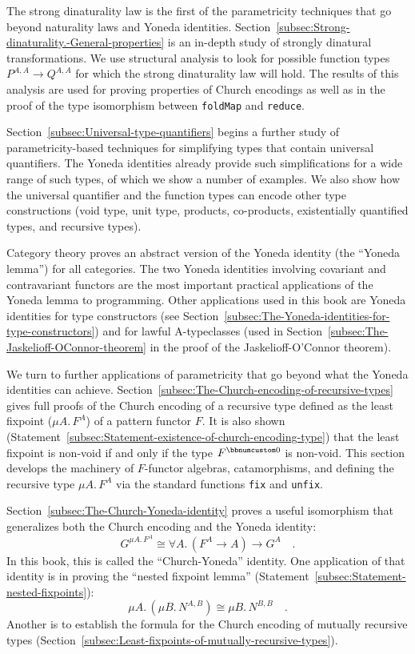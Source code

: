 The strong dinaturality law is the first of the parametricity techniques
that go beyond naturality laws and Yoneda identities. Section~\ref{subsec:Strong-dinaturality.-General-properties}
is an in-depth study of strongly dinatural transformations. We use
structural analysis to look for possible function types $P^{A,A}\rightarrow Q^{A,A}$
for which the strong dinaturality law will hold. The results of this
analysis are used for proving properties of Church encodings as well
as in the proof of the type isomorphism between \lstinline!foldMap!
and \lstinline!reduce!.

Section~\ref{subsec:Universal-type-quantifiers} begins a further
study of parametricity-based techniques for simplifying types that
contain universal quantifiers. The Yoneda identities already provide
such simplifications for a wide range of such types, of which we show
a number of examples. We also show how the universal quantifier and
the function types can encode other type constructions (void type,
unit type, products, co-products, existentially quantified types,
and recursive types).

Category theory proves an abstract version of the Yoneda identity
(the \textsf{``}Yoneda lemma\textsf{''}) for all categories. The two Yoneda identities
involving covariant and contravariant functors are the most important
practical applications of the Yoneda lemma to programming. Other applications
used in this book are Yoneda identities for type constructors (see
Section~\ref{subsec:The-Yoneda-identities-for-type-constructors})
and for lawful A-typeclasses (used in Section~\ref{subsec:The-Jaskelioff-OConnor-theorem}
in the proof of the Jaskelioff-O\textsf{'}Connor theorem).

We turn to further applications of parametricity that go beyond what
the Yoneda identities can achieve. Section~\ref{subsec:The-Church-encoding-of-recursive-types}
gives full proofs of the Church encoding of a recursive type defined
as the least fixpoint ($\mu A.\,F^{A}$) of a pattern functor $F$.
It is also shown (Statement~\ref{subsec:Statement-existence-of-church-encoding-type})
that the least fixpoint is non-void if and only if the type $F^{\bbnum 0}$
is non-void. This section develops the machinery of $F$-functor algebras,
catamorphisms, and defining the recursive type $\mu A.\,F^{A}$ via
the standard functions \lstinline!fix! and \lstinline!unfix!.

Section~\ref{subsec:The-Church-Yoneda-identity} proves a useful
isomorphism that generalizes both the Church encoding and the Yoneda
identity:
\[
G^{\mu A.\,F^{A}}\cong\forall A.\,(F^{A}\rightarrow A)\rightarrow G^{A}\quad.
\]
In this book, this is called the \textsf{``}Church-Yoneda\textsf{''} identity. One
application of that identity is in proving the \textsf{``}nested fixpoint
lemma\textsf{''} (Statement~\ref{subsec:Statement-nested-fixpoints}):
\[
\mu A.\,(\mu B.\,N^{A,B})\cong\mu B.\,N^{B,B}\quad.
\]
Another is to establish the formula for the Church encoding of mutually
recursive types (Section~\ref{subsec:Least-fixpoints-of-mutually-recursive-types}).

